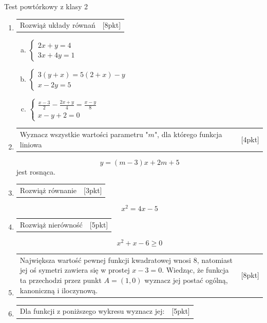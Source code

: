\documentclass[12pt,a4paper]{article}
\begin{document}
	
	\begin{center}
		\LARGE Test powtórkowy z klasy 2
	\end{center}
	\vspace{1.5cm}
	
	\begin{enumerate}[1.]
	
	\item  \begin{tabular}{p{13cm} r}
		Rozwiąż układy równań &[8pkt]\\ 
	\end{tabular}
	\begin{enumerate}[a)]
		\item $\left\{\begin{array}{c}
			2x+y=4\\
			3x+4y=1
		\end{array}\right.$
		\item $\left\{\begin{array}{c}
			3(y+x)=5(2+x)-y\\
			x-2y=5
		\end{array}\right.$
		\item $\left\{\begin{array}{c}
			\frac{x-3}{2}-\frac{2x+y}{4}=\frac{x-y}{8}\\
			x-y+2=0
		\end{array}\right.$
	\end{enumerate}

		\item \begin{tabular}{p{13cm} r}
			Wyznacz wszystkie wartości parametru "$m$", dla którego funkcja liniowa   &[4pkt]\\ 
		\end{tabular}
		$$y=(m-3)x + 2m+5$$ jest rosnąca.	

		\item \begin{tabular}{p{13cm} r}
			Rozwiąż równanie   &[3pkt]\\ 
		\end{tabular}
		 $$x^2=4x-5$$
		
		\item \begin{tabular}{p{13cm} r}
			Rozwiąż nierówność &[5pkt]\\ 
		\end{tabular}
		 $$x^2+x-6\geq0$$
		
		\item \begin{tabular}{p{13cm} r}
			Największa wartość pewnej funkcji kwadratowej wnosi 8, natomiast jej oś symetri zawiera się w prostej $x-3=0$. Wiedząc, że funkcja ta przechodzi przez punkt $A=(1,0)$ wyznacz jej postać ogólną, kanoniczną i iloczynową.  &[8pkt]\\ 
		\end{tabular}
	\newpage
				\item \begin{tabular}{p{13cm} r}
		Dla funkcji z poniższego wykresu wyznacz jej: &[5pkt]\\ 
	\end{tabular}




\end{enumerate}
\end{document}
